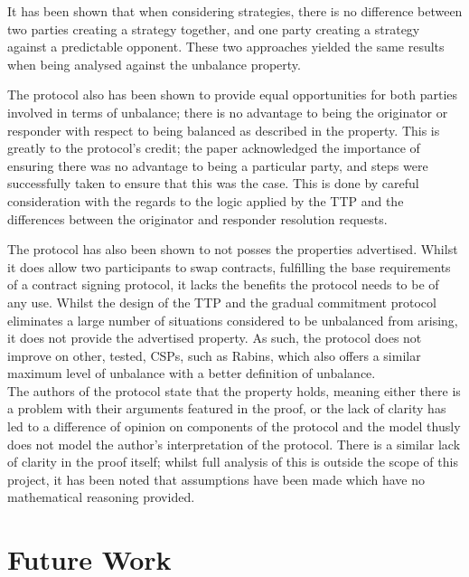 \documentclass{l4proj}
\begin{document}
It has been shown that when considering strategies, there is no difference between two parties creating a strategy together, and one party creating a strategy against a predictable opponent. These two approaches yielded the same results when being analysed against the unbalance property.

The protocol also has been shown to provide equal opportunities for both parties involved in terms of unbalance; there is no advantage to being the originator or responder with respect to being balanced as described in the property. This is greatly to the protocol's credit; the paper acknowledged the importance of ensuring there was no advantage to being a particular party, and steps were successfully taken to ensure that this was the case. This is done by careful consideration with the regards to the logic applied by the TTP and the differences between the originator and responder resolution requests.

The protocol has also been shown to not posses the properties advertised. Whilst it does allow two participants to swap contracts, fulfilling the base requirements of a contract signing protocol, it lacks the benefits the protocol needs to be of any use. Whilst the design of the TTP and the gradual commitment protocol eliminates a large number of situations considered to be unbalanced from arising, it does not provide the advertised property. As such, the protocol does not improve on other, tested, CSPs, such as Rabins, which also offers a similar maximum level of unbalance with a better definition of unbalance.\\
The authors of the protocol state that the property holds, meaning either there is a problem with their arguments featured in the proof, or the lack of clarity has led to a difference of opinion on components of the protocol and the model thusly does not model the author's interpretation of the protocol.
There is a similar lack of clarity in the proof itself; whilst full analysis of this is outside the scope of this project, it has been noted that assumptions have been made which have no mathematical reasoning provided.


\section{Future Work}
\end{document}
